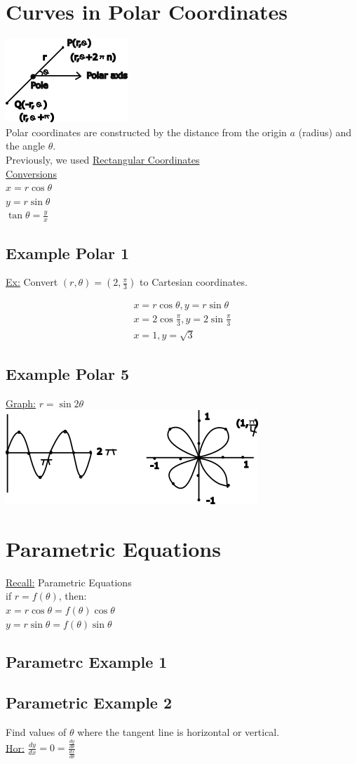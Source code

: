 \documentclass[12pt]{article}
\begin{document}
\section{Curves in Polar Coordinates}
\includegraphics{polarcoordinates}\\%
Polar coordinates are constructed by the distance from the origin $a$ (radius) and the angle $\theta$.\\%
Previously, we used \underline{Rectangular Coordinates}\\%
\underline{Conversions}\\%
$x=r\cos\theta$\\%
$y=r\sin\theta$\\%
$\tan\theta=\frac{y}{x}$

\subsection{Example Polar 1}
\underline{Ex:} Convert $(r,\theta)=(2,\frac{\pi}{3})$ to Cartesian coordinates.

\begin{align}
	x=r \cos\theta, y=r \sin\theta\\%
	x=2 \cos \frac{\pi}{3}, y=2 \sin \frac{\pi}{3}\\%
	x=1, y=\sqrt{3}
\end{align}

\subsection{Example Polar 5}
\underline{Graph:} $r=\sin2\theta$\\%
\includegraphics{flowerpolar}

\section{Parametric Equations}
\underline{Recall:} Parametric Equations\\%
if $r=f(\theta)$, then:\\%
$x=r\cos\theta = f(\theta)\cos\theta$\\%
$y=r\sin\theta=f(\theta)\sin\theta$

\subsection{Parametrc Example 1}

\subsection{Parametric Example 2}
Find  values of $\theta$ where the tangent line is horizontal or vertical.\\%
\underline{Hor:} $\frac{dy}{dx}=0=\frac{\frac{dy}{d\theta}}{\frac{dx}{d\theta}}$
\end{document}
